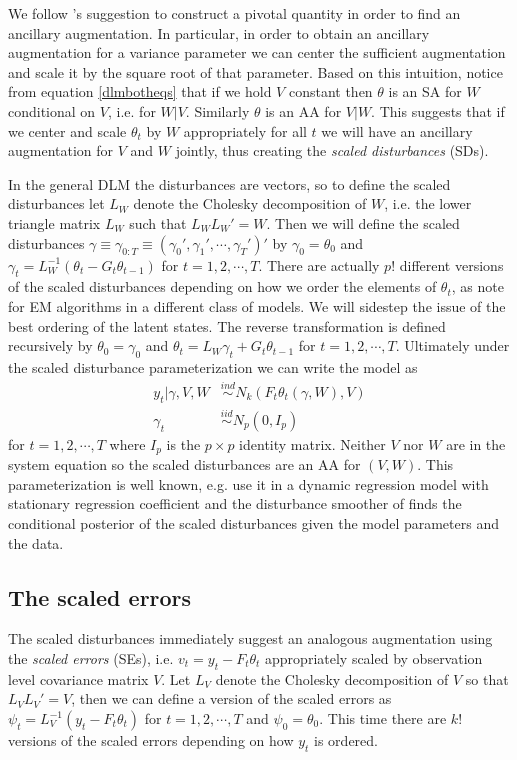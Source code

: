 \documentclass[12pt]{article}
\begin{document}
We follow \citet{papaspiliopoulos2007general}'s suggestion to construct a pivotal quantity in order to find an ancillary augmentation. In particular, in order to obtain an ancillary augmentation for a variance parameter we can center the sufficient augmentation and scale it by the square root of that parameter. Based on this intuition, notice from equation \eqref{dlmbotheqs} that if we hold $V$ constant then $\theta$ is an SA for $W$ conditional on $V$, i.e. for $W|V$. Similarly $\theta$ is an AA for $V|W$. This suggests that if we center and scale $\theta_{t}$ by $W$ appropriately for all $t$ we will have an ancillary augmentation for $V$ and $W$ jointly, thus creating the {\it scaled disturbances} (SDs).

In the general DLM the disturbances are vectors, so to define the scaled disturbances let $L_W$ denote the Cholesky decomposition of $W$, i.e. the lower triangle matrix $L_W$ such that $L_WL_W' =W$. Then we will define the scaled disturbances $\gamma\equiv\gamma_{0:T}\equiv(\gamma_0',\gamma_1',\cdots,\gamma_T')'$ by $\gamma_0=\theta_0$ and $\gamma_t = L_W^{-1}(\theta_t-G_t\theta_{t-1})$ for $t=1,2,\cdots,T$. There are actually $p!$ different versions of the scaled disturbances depending on how we order the elements of $\theta_t$, as \citet{meng1998fast} note for EM algorithms in a different class of models. We will sidestep the issue of the best ordering of the latent states. The reverse transformation is defined recursively by $\theta_0=\gamma_0$ and $\theta_t=L_W\gamma_t + G_t\theta_{t-1}$ for $t=1,2,\cdots,T$. Ultimately under the scaled disturbance parameterization we can write the model as
\begin{align}
  y_t|\gamma,V,W & \stackrel{ind}{\sim} N_k\left(F_t\theta_t(\gamma,W), V\right)\nonumber\\
  \gamma_t & \stackrel{iid}{\sim}N_p(0,I_p) \label{dlmdistmodel}
\end{align}
for $t=1,2,\cdots,T$ where $I_p$ is the $p\times p$ identity matrix. Neither $V$ nor $W$ are in the system equation so the scaled disturbances are an AA for $(V,W)$. This parameterization is well known, e.g. \citet{fruhwirth2004efficient} use it in a dynamic regression model with stationary regression coefficient and the disturbance smoother of \citet{koopman1993disturbance} finds the conditional posterior of the scaled disturbances given the model parameters and the data.

\subsection{The scaled errors}\label{sec:DAs:error}
The scaled disturbances immediately suggest an analogous augmentation using the {\it scaled errors} (SEs), i.e. $v_t=y_t - F_t\theta_t$ appropriately scaled by observation level covariance matrix $V$. Let $L_V$ denote the Cholesky decomposition of $V$ so that $L_VL_V'=V$, then we can define a version of the scaled errors as $\psi_t = L_V^{-1}(y_t - F_t\theta_t)$ for $t=1,2,\cdots,T$ and $\psi_0 = \theta_0$. This time there are $k!$ versions of the scaled errors depending on how $y_t$ is ordered.
\end{document}
